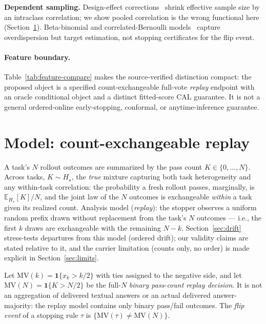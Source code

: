 \documentclass{article}
\theoremstyle{definition}
\theoremstyle{remark}
\newcommand{\trueH}{H_\star}
\newcommand{\MV}{\mathrm{MV}}
\newcommand{\E}{\mathbb{E}}
\begin{document}
\textbf{Dependent sampling.} Design-effect corrections~\citep{kish1965deff}
shrink effective sample size by an intraclass correlation; we show pooled
correlation is the wrong functional here (Section~\ref{sec:model}).
Beta-binomial and correlated-Bernoulli
models~\citep{skellam1948betabinomial} capture overdispersion but target
estimation, not stopping certificates for the flip event.

\paragraph{Feature boundary.} Table~\ref{tab:feature-compare} makes the
source-verified distinction compact: the proposed object is a specified
count-exchangeable full-vote \emph{replay} endpoint with an oracle conditional
object and a distinct fitted-score CAL guarantee. It is not a general
ordered-online early-stopping, conformal, or anytime-inference guarantee.

\section{Model: count-exchangeable replay}
\label{sec:model}

A task's $N$ rollout outcomes are summarized by the pass count
$K\in\{0,\dots,N\}$. Across tasks, $K\sim\trueH$, the \emph{true} mixture
capturing both
task heterogeneity and any within-task correlation: the probability a fresh
rollout passes, marginally, is $\E_{\trueH}[K]/N$, and the joint law of the $N$
outcomes is exchangeable \emph{within} a task given its realized count.
Analysis model (\emph{replay}): the stopper observes a uniform random
prefix drawn without replacement from the task's $N$ outcomes --- i.e., the
first $k$ draws are exchangeable with the remaining $N-k$.
Section~\ref{sec:drift} stress-tests departures from this model (ordered
drift); our validity claims are stated relative to it, and the carrier
limitation (counts only, no order) is made explicit in
Section~\ref{sec:limits}.

Let $\MV(k)=\mathbf{1}\{x_k>k/2\}$ with ties assigned to the negative side,
and let $\MV(N)=\mathbf{1}\{K>N/2\}$ be the full-$N$ \emph{binary
pass-count replay decision}.  It is not an aggregation of delivered textual
answers or an actual delivered answer-majority: the replay model contains only
binary pass/fail outcomes. The \emph{flip event} of a stopping rule $\tau$ is
$\{\MV(\tau)\neq\MV(N)\}$.
\end{document}
